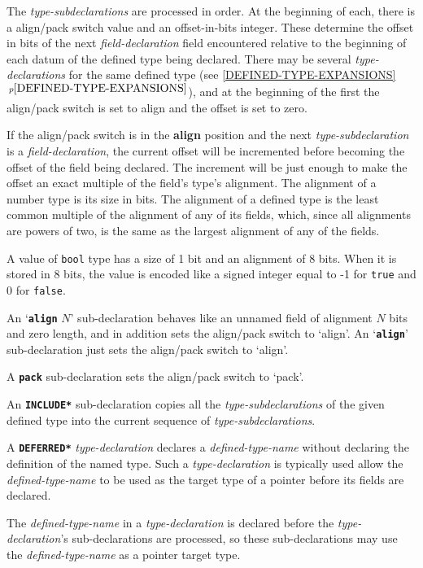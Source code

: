 \documentclass[12pt]{article}
\newcommand{\key}[1]{{\rm \bfseries #1}}
\newcommand{\ttkey}[1]{{\tt \bfseries #1}}
\newcommand{\itemref}[1]{\ref{#1}$\,^{p\pageref{#1}}$}
\begin{document}
The {\em type-subdeclarations} are processed in order.  At the
beginning of each, there is a align/pack switch value and an
offset-in-bits integer.  These determine the offset in bits
of the next {\em field-declaration} field encountered
relative to the beginning of each datum of the defined
type being declared.  There may be several {\em type-declarations}
for the same defined type (see \itemref{DEFINED-TYPE-EXPANSIONS}),
and at the beginning
of the first the align/pack switch is set to align and the offset
is set to zero.

If the align/pack switch is in the \key{align} position and the
next {\em type-subdeclaration} is a {\em field-declaration}, the
current offset will be incremented before becoming the offset
of the field being declared.  The increment will be just enough
to make the offset an exact multiple of the field's type's alignment.
The alignment of a number type is its size in bits.  The alignment
of a defined type is the least common multiple of the alignment of
any of its fields, which, since all alignments are powers of two,
is the same as the largest alignment of any of the fields.

A value of {\tt bool} type has a size of 1 bit and an alignment
of 8 bits.  When it is stored in 8 bits, the value is encoded
like a signed integer equal to -1 for {\tt true} and 0 for {\tt false}.

An `\ttkey{align} $N$' sub-declaration behaves like an unnamed
field of alignment $N$ bits and zero length,
and in addition sets the align/pack switch to `align'.
An `\ttkey{align}' sub-declaration just sets the
align/pack switch to `align'.

A \ttkey{pack} sub-declaration sets the align/pack switch to `pack'.

An \ttkey{*INCLUDE*} sub-declaration copies all the {\em type-subdeclarations}
of the given defined type into the current sequence of
{\em type-subdeclarations}.

A \ttkey{*DEFERRED*} {\em type-declaration} declares a {\em defined-type-name}
without declaring the definition of the named type.
Such a {\em type-declaration} is typically used allow the
{\em defined-type-name}
to be used as the target type of a pointer before its fields are declared.

The {\em defined-type-name} in a {\em type-declaration} is declared before
the {\em type-declaration}'s sub-declarations are processed, so these
sub-declarations may use the {\em defined-type-name} as a pointer target type.
\end{document}
